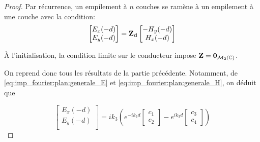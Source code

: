         \begin{proof}
            Par récurrence, un empilement à $n$ couches se ramène à un empilement à une couche avec la condition:
            \begin{equation}
                \begin{bmatrix}
                    E_x(-d)\\
                    E_y(-d)\\
                \end{bmatrix}
                =
                \mathbf{Z_{d}} 
                \begin{bmatrix}
                    -H_y(-d)\\
                    H_x(-d)\\
                \end{bmatrix}
            \end{equation}

            À l'initialisation, la condition limite sur le conducteur impose $\mathbf{Z} = \mathbf{0}_{\mathcal{M}_2(\mathbb C)}$.

            On reprend donc tous les résultats de la partie précédente. Notamment, de \eqref{eq:imp_fourier:plan:generale_E} et \eqref{eq:imp_fourier:plan:generale_H}, on déduit que

            \begin{equation}
                \begin{bmatrix}
                    E_x(-d)\\
                    E_y(-d)\\
                \end{bmatrix}
                = ik_3\left( e^{-ik_3 d}
                \begin{bmatrix}
                    c_1 \\
                    c_2
                \end{bmatrix}
                -e^{ik_3 d}
                \begin{bmatrix}
                    c_3 \\
                    c_4
                \end{bmatrix}
                \right)
            \end{equation}


\end{proof}
